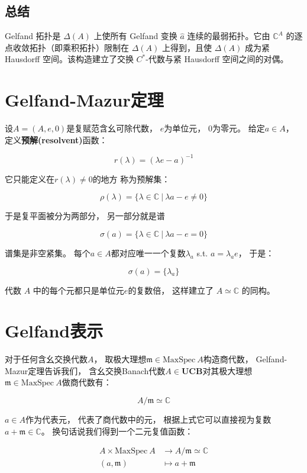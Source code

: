 \documentclass[10pt, openany]{book}
\begin{document}
\subsection{总结}

Gelfand 拓扑是 $\Delta(A)$ 上使所有 Gelfand 变换 $\hat{a}$ 连续的最弱拓扑。它由 $\mathbb{C}^A$ 的逐点收敛拓扑（即乘积拓扑）限制在 $\Delta(A)$ 上得到，且使 $\Delta(A)$ 成为紧 Hausdorff 空间。该构造建立了交换 $C^*$-代数与紧 Hausdorff 空间之间的对偶。

\section{Gelfand-Mazur定理}

设$A = (A,e,0)$是复赋范含幺可除代数，
$e$为单位元，
$0$为零元。
给定$a \in A$，
定义\textbf{预解(resolvent)}函数：

$$
r(\lambda) = (\lambda e - a)^{-1}
$$

它只能定义在$r(\lambda) \neq 0$的地方
称为预解集：

$$
\rho(\lambda) = \{ \lambda \in \mathbb C \ | \ \lambda a - e \neq 0 \}
$$

于是复平面被分为两部分，
另一部分就是谱

$$
\sigma(a) = \{ \lambda \in \mathbb C \ | \ \lambda a - e = 0 \}
$$

谱集是非空紧集。
每个$a \in A$都对应唯一一个复数$\lambda_a$ s.t. $a = \lambda_a e$，
于是：

$$
\sigma(a) = \{ \lambda_a \}
$$

代数 $A$ 中的每个元都只是单位元$e$的复数倍，
这样建立了 $A \simeq \mathbb C$ 的同构。

\section{Gelfand表示}


对于任何含幺交换代数$A$，
取极大理想$\mathfrak m \in \text{MaxSpec} \ A$构造商代数，
Gelfand-Mazur定理告诉我们，
含幺交换Banach代数$A \in \textbf{UCB}$对其极大理想$\mathfrak m\in\text{MaxSpec} \ A$做商代数有：

$$
A/\mathfrak m \simeq \mathbb C
$$

$a \in A$作为代表元，
代表了商代数中的元，
根据上式它可以直接视为复数
$a + \mathfrak m \in \mathbb C$。
换句话说我们得到一个二元复值函数：

$$
\begin{aligned}
A \times \text{MaxSpec} \ A &\to A/\mathfrak m \simeq \mathbb C \\
(a,\mathfrak m) &\mapsto a + \mathfrak m 
\end{aligned}
$$
\end{document}
